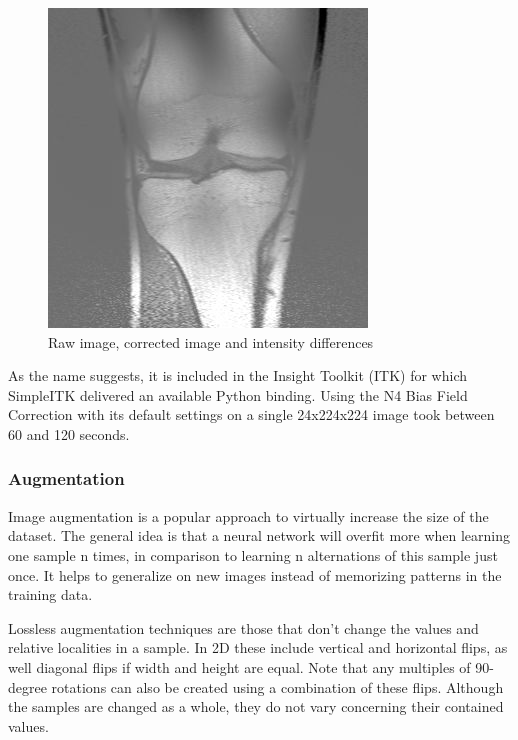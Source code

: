 \begin{figure}[H]
\endminipage\hfill
{}%
  \includegraphics[width=\linewidth]{imgs/diff2.jpg}
\endminipage
\caption{Raw image, corrected image and intensity differences}
\end{figure}

As the name suggests, it is included in the Insight Toolkit (ITK) for which SimpleITK delivered an available Python binding. Using the N4 Bias Field Correction with its default settings on a single 24x224x224 image took between 60 and 120 seconds.

\subsubsection{Augmentation}

Image augmentation is a popular approach to virtually increase the size of the dataset. The general idea is that a neural network will overfit more when learning one sample n times, in comparison to learning n alternations of this sample just once. It helps to generalize on new images instead of memorizing patterns in the training data.

Lossless augmentation techniques are those that don't change the values and relative localities in a sample. In 2D these include vertical and horizontal flips, as well diagonal flips if width and height are equal. Note that any multiples of 90-degree rotations can also be created using a combination of these flips. Although the samples are changed as a whole, they do not vary concerning their contained values. 

